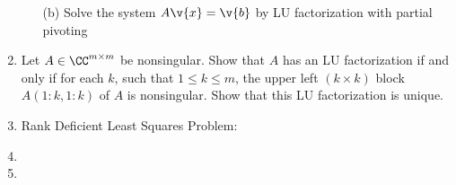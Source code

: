 \documentclass[11pt]{article}
\begin{document}
\begin{enumerate}
\begin{enumerate}
            \item[(b)]
                Solve the system $A\v{x} = \v{b}$ by LU factorization with
                partial pivoting
        \end{enumerate}

    \item %
        Let $A \in \CC^{m \times m}$ be nonsingular.
        Show that $A$ has an LU factorization if and only if for each $k$, such
        that $1 \le k \le m$, the upper left $(k \times k)$ block $A(1:k, 1:k)$
        of $A$ is nonsingular.
        Show that this LU factorization is unique.

    \item %
        Rank Deficient Least Squares Problem:
    \item %
    \item %
\end{enumerate}
\end{document}

